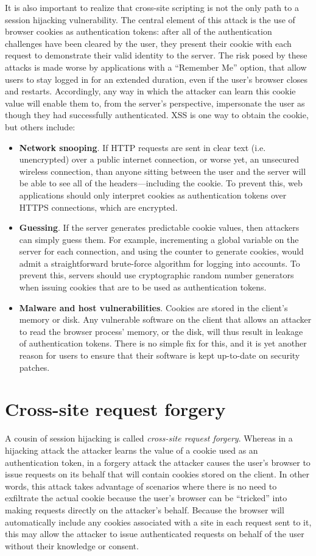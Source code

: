 \documentclass[11pt,twoside]{scrartcl}
\begin{document}
It is also important to realize that cross-site scripting is not the only path to a session hijacking vulnerability.
The central element of this attack is the use of browser cookies as authentication tokens: after all of the authentication challenges have been cleared by the user, they present their cookie with each request to demonstrate their valid identity to the server.
The risk posed by these attacks is made worse by applications with a ``Remember Me'' option, that allow users to stay logged in for an extended duration, even if the user's browser closes and restarts.
Accordingly, any way in which the attacker can learn this cookie value will enable them to, from the server's perspective, impersonate the user as though they had successfully authenticated.
XSS is one way to obtain the cookie, but others include:
\begin{itemize}
\item \textbf{Network snooping}. If HTTP requests are sent in clear text (i.e. unencrypted) over a public internet connection, or worse yet, an unsecured wireless connection, than anyone sitting between the user and the server will be able to see all of the headers---including the cookie. 
To prevent this, web applications should only interpret cookies as authentication tokens over HTTPS connections, which are encrypted.
\item \textbf{Guessing}. If the server generates predictable cookie values, then attackers can simply guess them. 
For example, incrementing a global variable on the server for each connection, and using the counter to generate cookies, would admit a straightforward brute-force algorithm for logging into accounts.
To prevent this, servers should use cryptographic random number generators when issuing cookies that are to be used as authentication tokens.
\item \textbf{Malware and host vulnerabilities}. Cookies are stored in the client's memory or disk.
Any vulnerable software on the client that allows an attacker to read the browser process' memory, or the disk, will thus result in leakage of authentication tokens.
There is no simple fix for this, and it is yet another reason for users to ensure that their software is kept up-to-date on security patches.
\end{itemize}

\section{Cross-site request forgery} 
A cousin of session hijacking is called \emph{cross-site request forgery}. 
Whereas in a hijacking attack the attacker learns the value of a cookie used as an authentication token, in a forgery attack the attacker causes the user's browser to issue requests on its behalf that will contain cookies stored on the client.
In other words, this attack takes advantage of scenarios where there is no need to exfiltrate the actual cookie because the user's browser can be ``tricked'' into making requests directly on the attacker's behalf.
Because the browser will automatically include any cookies associated with a site in each request sent to it, this may allow the attacker to issue authenticated requests on behalf of the user without their knowledge or consent.
\end{document}
